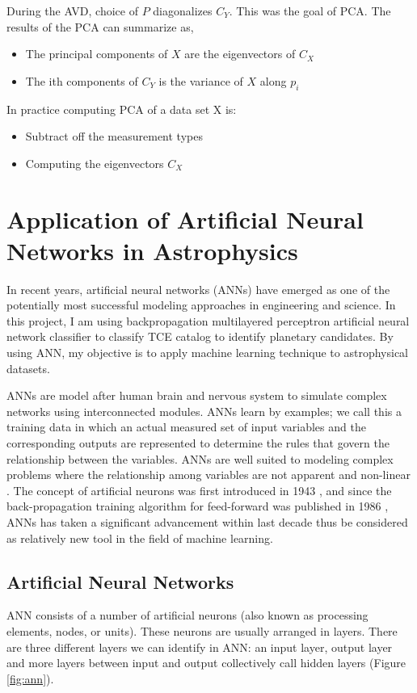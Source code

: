 During the AVD, choice of $P$ diagonalizes $C_Y$. This was the goal of PCA. The results of the PCA can summarize as, 
\begin{itemize}
  \item The principal components of $X$ are the eigenvectors of $C_X$
  \item The ith components of $C_Y$ is the variance of $X$ along $p_i$
\end{itemize}


In practice computing PCA of a data set X is:

\begin{itemize}
  \item  Subtract off the measurement types
  \item  Computing the eigenvectors $C_X$
\end{itemize}


\section{Application of Artificial Neural Networks in Astrophysics}
In recent years, artificial neural networks (ANNs) have emerged as one of the potentially most successful modeling approaches in engineering and science. In this project, I am using backpropagation multilayered perceptron artificial neural network classifier to classify TCE catalog to identify planetary candidates. By using ANN, my objective is to apply machine learning technique to astrophysical datasets. 

ANNs are model after human brain and nervous system to simulate complex networks using interconnected modules. ANNs learn by examples; we call this a training data in which an actual measured set of input variables and the corresponding outputs are represented to determine the rules that govern the relationship between the variables. ANNs are well suited to modeling complex problems where the relationship among variables are not apparent and non-linear \cite{maier1995use}. The concept of artificial neurons was first introduced in 1943 \cite{mcculloch1943logical}, and since the back-propagation training algorithm for feed-forward was published in 1986 \cite{Rumelhart:1986:LIR:104279.104293}, ANNs has taken a significant advancement within last decade thus be considered as relatively new tool in the field of machine learning.

\subsection{Artificial Neural Networks}
ANN consists of a number of artificial neurons (also known as processing elements, nodes, or units). These neurons are usually arranged in layers. There are three different layers we can identify in ANN: an input layer, output layer and more layers between input and output collectively call hidden layers (Figure \ref{fig:ann}). 

